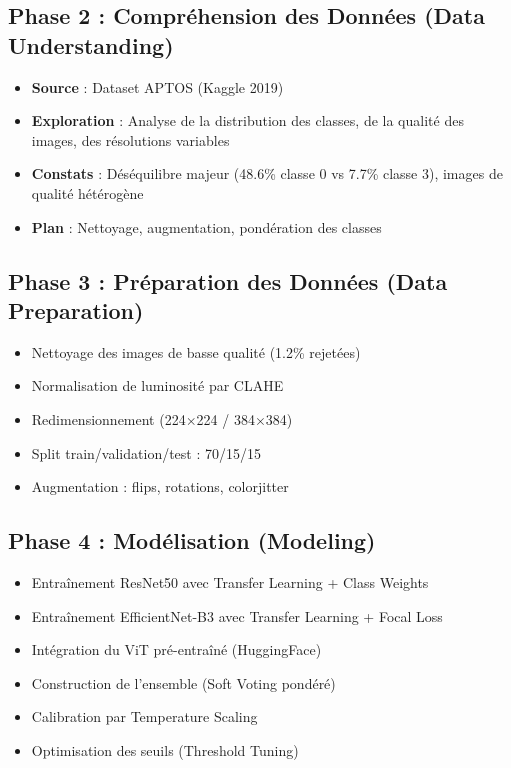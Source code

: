 \documentclass[12pt,a4paper,oneside]{report}
\begin{document}
\subsection{Phase 2 : Compréhension des Données (Data Understanding)}

\begin{itemize}
    \item \textbf{Source} : Dataset APTOS (Kaggle 2019)
    \item \textbf{Exploration} : Analyse de la distribution des classes,
          de la qualité des images, des résolutions variables
    \item \textbf{Constats} : Déséquilibre majeur (48.6\% classe 0 vs
          7.7\% classe 3), images de qualité hétérogène
    \item \textbf{Plan} : Nettoyage, augmentation, pondération des classes
\end{itemize}

\subsection{Phase 3 : Préparation des Données (Data Preparation)}

\begin{itemize}
    \item Nettoyage des images de basse qualité (1.2\% rejetées)
    \item Normalisation de luminosité par CLAHE
    \item Redimensionnement (224$\times$224 / 384$\times$384)
    \item Split train/validation/test : 70/15/15
    \item Augmentation : flips, rotations, colorjitter
\end{itemize}

\subsection{Phase 4 : Modélisation (Modeling)}

\begin{itemize}
    \item Entraînement ResNet50 avec Transfer Learning + Class Weights
    \item Entraînement EfficientNet-B3 avec Transfer Learning + Focal Loss
    \item Intégration du ViT pré-entraîné (HuggingFace)
    \item Construction de l'ensemble (Soft Voting pondéré)
    \item Calibration par Temperature Scaling
    \item Optimisation des seuils (Threshold Tuning)
\end{itemize}
\end{document}
